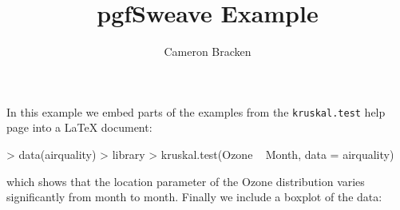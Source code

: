 \documentclass{article}
\title{pgfSweave Example}
\author{Cameron Bracken}
\begin{document}
\maketitle
In this example we embed parts of the examples from the \texttt{kruskal.test} 
help page into a \LaTeX{} document:

\begin{Schunk}
\begin{Sinput}
> data(airquality)
> library
> kruskal.test(Ozone ~ Month, data = airquality)
\end{Sinput}
\end{Schunk}
which shows that the location parameter of the Ozone distribution varies 
significantly from month to month. Finally we include a boxplot of the data:

\begin{center}

\endpgfgraphicnamed
\end{center}
\end{document}
